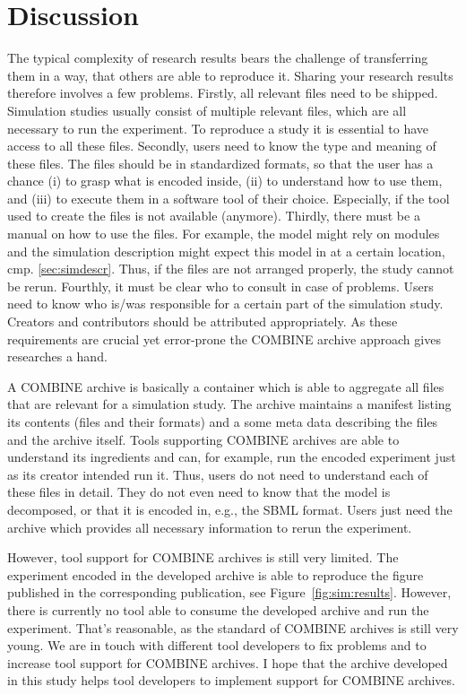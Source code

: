 

\section{Discussion}
The typical complexity of research results bears the challenge of transferring them in a way, that others are able to reproduce it.
Sharing your research results therefore involves a few problems.
Firstly, all relevant files need to be shipped.
Simulation studies usually consist of multiple relevant files, which are all necessary to run the experiment.
To reproduce a study it is essential to have access to all these files.
Secondly, users need to know the type and meaning of these files.
The files should be in standardized formats, so that the user has a chance (i) to grasp what is encoded inside, (ii) to understand how to use them, and (iii) to execute them in a software tool of their choice.
Especially, if the tool used to create the files is not available (anymore).
Thirdly, there must be a manual on how to use the files.
For example, the model might rely on modules and the simulation description might expect this model in at a certain location, cmp. \ref{sec:simdescr}.
Thus, if the files are not arranged properly, the study cannot be rerun.
Fourthly, it must be clear who to consult in case of problems.
Users need to know who is/was responsible for a certain part of the simulation study.
Creators and contributors should be attributed appropriately.
As these requirements are crucial yet error-prone the COMBINE archive approach gives researches a hand.

A COMBINE archive is basically a container which is able to aggregate all files that are relevant for a simulation study.
The archive maintains a manifest listing its contents (files and their formats) and a some meta data describing the files and the archive itself.
Tools supporting COMBINE archives are able to understand its ingredients and can, for example, run the encoded experiment just as its creator intended run it.
Thus, users do not need to understand each of these files in detail.
They do not even need to know that the model is decomposed, or that it is encoded in, e.g., the SBML format.
Users just need the archive which provides all necessary information to rerun the experiment.

However, tool support for COMBINE archives is still very limited.
The experiment encoded in the developed archive is able to reproduce the figure published in the corresponding publication, see Figure~\ref{fig:sim:results}.
However, there is currently no tool able to consume the developed archive and run the experiment.
That's reasonable, as the standard of COMBINE archives is still very young.
We are in touch with different tool developers to fix problems and to increase tool support for COMBINE archives.
I hope that the archive developed in this study helps tool developers to implement support for COMBINE archives.



